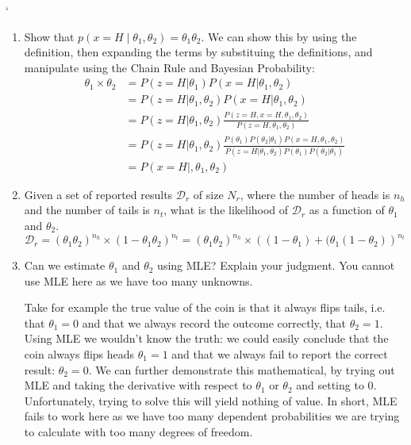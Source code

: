 `\documentclass{article}
\theoremstyle{plain}
\theoremstyle{definition}
\begin{document}
\begin{enumerate}
  \setcounter{enumi}{\value{saveenum}}
\item Show that $p(x=H\mid \theta_1, \theta_2) = \theta_1 \theta_2$.
\subitem
We can show this by using the definition, then expanding the terms by substituing the definitions, and manipulate using the Chain Rule and Bayesian Probability:
\begin{equation}
    \begin{split}
        \theta_1 \times \theta_2 &= 
        P(z=H|\theta_1)P(x=H|\theta_1,\theta_2) \\
        &= P(z=H|\theta_1,\theta_2)P(x=H|\theta_1,\theta_2) \\
        &= P(z=H|\theta_1,\theta_2) \frac{P(z=H,x=H,\theta_1,\theta_2)}{P(z=H,\theta_1,\theta_2)} \\
        &= P(z=H|\theta_1,\theta_2) \frac{P(\theta_1)P(\theta_2|\theta_1)P(x=H,\theta_1,\theta_2)}{P(z=H|\theta_1,\theta_2)P(\theta_1)P(\theta_2|\theta_1)} \\
        &= P(x=H|,\theta_1,\theta_2)
    \end{split}
\end{equation}

\item Given a set of reported results $\mathcal{D}_r$ of size $N_r$, where the number of heads is $n_h$ and the number of tails is $n_t$, what is the likelihood of $\mathcal{D}_r$ as a function of $\theta_1$ and $\theta_2$.
\subitem
$$\mathcal{D}_r = (\theta_1\theta_2)^{n_h} \times (1-\theta_1\theta_2)^{n_t} =  (\theta_1\theta_2)^{n_h} \times \left( (1-\theta_1)+(\theta_1(1-\theta_2) \right)^{n_t}$$ 

\item Can we estimate $\theta_1$ and $\theta_2$ using MLE? Explain your judgment.
\subitem
You cannot use MLE here as we have too many unknowns. 

Take for example the true value of the coin is that it always flips tails, i.e. that $\theta_1 = 0$ and that we always record the outcome correctly, that $\theta_2=1$. Using MLE we wouldn't know the truth: we could easily conclude that the coin always flips heads $\theta_1=1$ and that we always fail to report the correct result: $\theta_2=0$. We can further demonstrate this mathematical, by trying out MLE and taking the derivative with respect to $\theta_1$ or $\theta_2$ and setting to 0. Unfortunately, trying to solve this will yield nothing of value. In short, MLE fails to work here as we have too many dependent probabilities we are trying to calculate with too many degrees of freedom.


\setcounter{saveenum}{\value{enumi}}
\end{enumerate}
\end{document}
